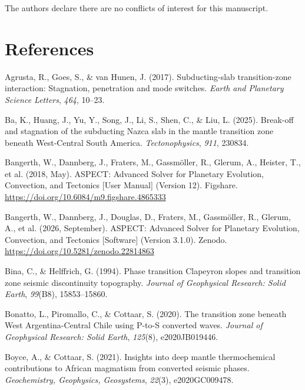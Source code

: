 \documentclass[draft,linenumbers]{agujournal2019}
\newlength{\cslhangindent}
\newenvironment{CSLReferences}[2]
 {\begin{list}{}{
  \setlength{\itemindent}{0pt}
  \setlength{\leftmargin}{0pt}
  \setlength{\parsep}{0pt}
  \ifodd #1
   \setlength{\leftmargin}{\cslhangindent}
   \setlength{\itemindent}{-\cslhangindent}
  \fi
  \setlength{\itemsep}{#2\baselineskip}
  }
  \item\relax}
 {\end{list}}
\begin{document}
The authors declare there are no conflicts of interest for this
manuscript.

\clearpage

\section*{References}\label{sec:references}

\protect{}\label{refs}
\begin{CSLReferences}{1}{0}
{Agrusta, R., Goes, S., \& van Hunen, J.} (2017). Subducting-slab
transition-zone interaction: Stagnation, penetration and mode switches.
\emph{Earth and Planetary Science Letters}, \emph{464}, 10--23.

Ba, K., Huang, J., Yu, Y., Song, J., Li, S., Shen, C., \& Liu, L.
(2025). Break-off and stagnation of the subducting {Nazca} slab in the
mantle transition zone beneath {West-Central South America}.
\emph{Tectonophysics}, \emph{911}, 230834.

Bangerth, W., Dannberg, J., Fraters, M., Gassmöller, R., Glerum, A.,
Heister, T., et al. (2018, May). {ASPECT: Advanced Solver for Planetary
Evolution, Convection, and Tectonics {[}User Manual{]}} (Version 12).
Figshare. \url{https://doi.org/10.6084/m9.figshare.4865333}

Bangerth, W., Dannberg, J., Douglas, D., Fraters, M., Gassmöller, R.,
Glerum, A., et al. (2026, September). {ASPECT: Advanced Solver for
Planetary Evolution, Convection, and Tectonics {[}Software{]}} (Version
3.1.0). Zenodo. \url{https://doi.org/10.5281/zenodo.22814863}

Bina, C., \& Helffrich, G. (1994). Phase transition {Clapeyron} slopes
and transition zone seismic discontinuity topography. \emph{Journal of
Geophysical Research: Solid Earth}, \emph{99}(B8), 15853--15860.

Bonatto, L., Piromallo, C., \& Cottaar, S. (2020). The transition zone
beneath {West Argentina}-{Central Chile} using {P-to-S} converted waves.
\emph{Journal of Geophysical Research: Solid Earth}, \emph{125}(8),
e2020JB019446.

Boyce, A., \& Cottaar, S. (2021). Insights into deep mantle
thermochemical contributions to {African} magmatism from converted
seismic phases. \emph{Geochemistry, Geophysics, Geosystems},
\emph{22}(3), e2020GC009478.


\end{CSLReferences}
\end{document}
